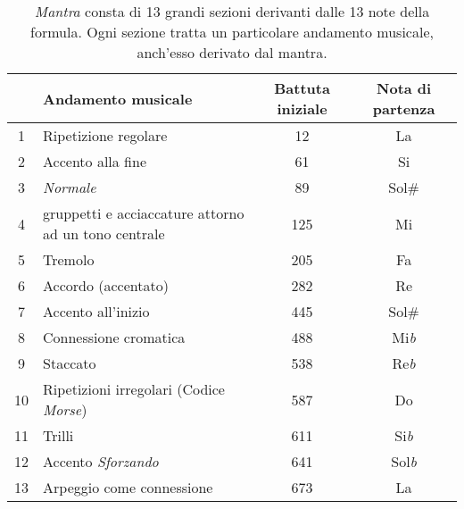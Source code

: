 \begin{table}[htp]
\begin{center}
\begin{sf}{\footnotesize
\begin{tabular}{|c|l|c|c|}

\hline
& Andamento musicale & Battuta iniziale & Nota di partenza \\
\hline
\hline
1 & Ripetizione regolare & 12 & La \\
\hline
2 & Accento alla fine & 61 & Si \\
\hline
3 & \emph{Normale} & 89 & Sol\# \\
\hline
4 & gruppetti e acciaccature attorno ad un tono centrale & 125 & Mi \\
\hline
5 & Tremolo & 205 & Fa \\
\hline
6 & Accordo (accentato) & 282 & Re \\
\hline
7 & Accento all'inizio & 445 & Sol\# \\
\hline
8 & Connessione cromatica & 488 & Mi\emph{b} \\
\hline
9 & Staccato & 538 & Re\emph{b} \\
\hline
10 & Ripetizioni irregolari (Codice \emph{Morse}) & 587 & Do \\
\hline
11 & Trilli & 611 & Si\emph{b} \\
\hline
12 & Accento \emph{Sforzando} & 641 & Sol\emph{b} \\
\hline
13 & Arpeggio come connessione & 673 & La \\
\hline

\end{tabular}}
\end{sf}
\end{center}
\caption{\emph{Mantra} consta di 13 grandi sezioni derivanti dalle 13 note della formula. Ogni sezione tratta un particolare andamento musicale, anch'esso derivato dal mantra.}

\label{default}
\end{table}%




